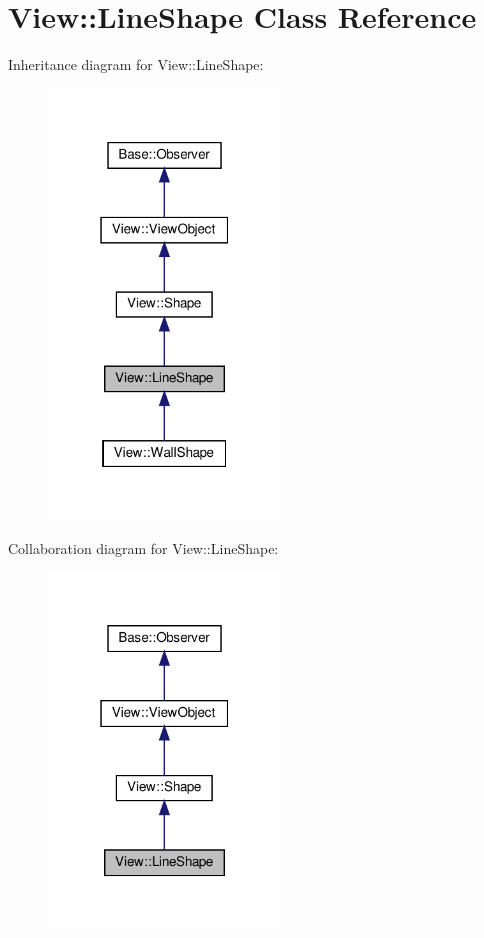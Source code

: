 \hypertarget{class_view_1_1_line_shape}{}\section{View\+:\+:Line\+Shape Class Reference}
\label{class_view_1_1_line_shape}


Inheritance diagram for View\+:\+:Line\+Shape\+:
\nopagebreak
\begin{figure}[H]
\begin{center}
\leavevmode
\includegraphics[width=175pt]{class_view_1_1_line_shape__inherit__graph}
\end{center}
\end{figure}


Collaboration diagram for View\+:\+:Line\+Shape\+:
\nopagebreak
\begin{figure}[H]
\begin{center}
\leavevmode
\includegraphics[width=175pt]{class_view_1_1_line_shape__coll__graph}
\end{center}
\end{figure}
